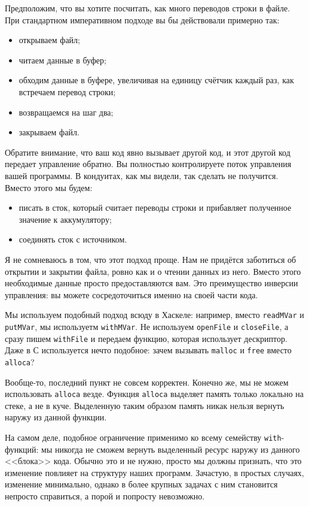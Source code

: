 Предположим, что вы хотите посчитать, как много переводов строки в файле. При
стандартном императивном подходе вы бы действовали примерно так:
\begin{itemize}
\item   открываем файл;
\item   читаем данные в буфер;
\item   обходим данные в буфере, увеличивая на единицу счётчик каждый раз, как встречаем перевод строки;
\item   возвращаемся на шаг два;
\item   закрываем файл.
\end{itemize}
Обратите внимание, что ваш код явно вызывает другой код, и этот другой код
передает управление обратно. Вы полностью контролируете поток
управления вашей программы. В кондуитах, как мы видели, так сделать
не получится. Вместо этого мы будем:
\begin{itemize}
\item  писать в сток, который считает переводы строки и прибавляет полученное значение к аккумулятору;
\item  соединять сток с источником.
\end{itemize}
Я не сомневаюсь в том, что этот подход проще. Нам не придётся заботиться об
открытии и закрытии файла, ровно как и о чтении данных из него. Вместо этого необходимые данные
просто предоставляются вам. Это преимущество инверсии управления: вы
можете сосредоточиться именно на своей части кода.

Мы используем подобный подход всюду в Хаскеле: например, вместо \lstinline'readMVar'
и \lstinline'putMVar', мы используетм \lstinline'withMVar'. Не используем
\lstinline'openFile' и \lstinline'closeFile', а сразу пишем \lstinline'withFile'
и передаем функцию, которая использует дескриптор. Даже в С используется нечто
подобное: зачем вызывать \lstinline'malloc' и \lstinline'free' вместо
\lstinline'alloca'?

Вообще-то, последний пункт не совсем корректен. Конечно же, мы не можем использовать
\lstinline'alloca' везде. Функция \lstinline'alloca' выделяет память только локально на
стеке, а не в куче. Выделенную таким образом память никак нельзя вернуть наружу из
данной функции.

На самом деле, подобное ограничение применимо ко всему семейству
\lstinline{with}-функций: мы никогда не сможем вернуть выделенный ресурс наружу из данного
<<блока>> кода. Обычно это и не нужно, просто мы должны признать, что это
изменение повлияет на структуру наших программ. Зачастую, в простых случаях, изменение минимально, однако в более крупных задачах с ним становится непросто справиться,
а порой и попросту невозможно.

